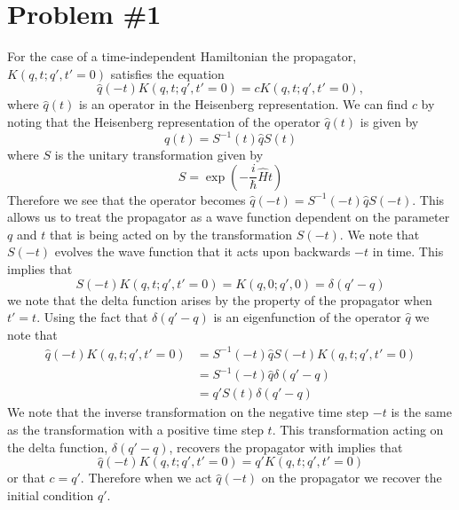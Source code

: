 \documentclass[11pt]{article}
\numberwithin{equation}{section}
\begin{document}


\section{Problem \#1}
For the case of a time-independent Hamiltonian the propagator, $K(q,t;q',t'=0)$ satisfies the
equation
$$\hat{q}(-t)K(q,t;q',t'=0) = cK(q,t;q',t'=0),$$
where $\hat{q}(t)$ is an operator in the Heisenberg representation. We can find $c$ by noting
that the Heisenberg representation of the operator $\hat{q}(t)$ is given by
$$\hat{q}(t) = S^{-1}(t)\hat{q}S(t)$$
where $S$ is the unitary transformation given by 
$$S = \exp\left(-\frac{i}{\hbar}\hat{H}t\right)$$
Therefore we see that the operator becomes $\hat{q}(-t) = S^{-1}(-t)\hat{q}S(-t)$. This 
allows us to treat the propagator as a wave function dependent on the parameter $q$ and 
$t$ that is being acted on by the transformation $S(-t)$. We note that $S(-t)$ evolves the
wave function that it acts upon backwards $-t$ in time. This implies that
$$S(-t)K(q,t;q',t'=0) = K(q,0;q',0) = \delta(q'-q)$$
we note that the delta function arises by the property of the propagator when $t'=t$. Using
the fact that $\delta(q'-q)$ is an eigenfunction of the operator $\hat{q}$ we note that
\begin{align*}
\hat{q}(-t)K(q,t;q',t'=0) &=  S^{-1}(-t)\hat{q}S(-t)K(q,t;q',t'=0)\\
&=  S^{-1}(-t)\hat{q}\delta(q'-q)\\
&=  q'S(t)\delta(q'-q)
\end{align*}
We note that the inverse transformation on the negative time step $-t$ is the same as the
transformation with a positive time step $t$. This transformation acting on the delta 
function, $\delta(q'-q)$, recovers the propagator with implies that
$$\hat{q}(-t)K(q,t;q',t'=0) = q'K(q,t;q',t'=0)$$
or that $c=q'$. Therefore when we act $\hat{q}(-t)$ on the propagator we recover the initial
condition $q'$.


\pagebreak
\end{document}
